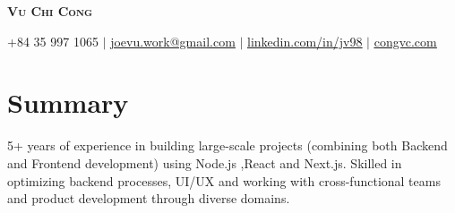 \documentclass[letterpaper,11pt]{article}
\newcommand{\resumeDesc}[1]{
  {#1\\ \vspace{0px}}
}
\begin{document}

\begin{center}
    \textbf{\Huge \scshape Vu Chi Cong} \par \vspace{1pt}
    \small +84 35 997 1065 $|$ \href{mailto:joevu.work@gmail.com}{\underline{joevu.work@gmail.com}} $|$ 
    \href{https://linkedin.com/in/jv98}{\underline{linkedin.com/in/jv98}} $|$
    \href{https://congvc.com}{\underline{congvc.com}}
\end{center}

\section{Summary}
\resumeDesc{5+ years of experience in building large-scale projects (combining both Backend and Frontend development) using Node.js ,React and Next.js. Skilled in optimizing backend processes, UI/UX and working with cross-functional teams and product development through diverse domains.}


\end{document}
